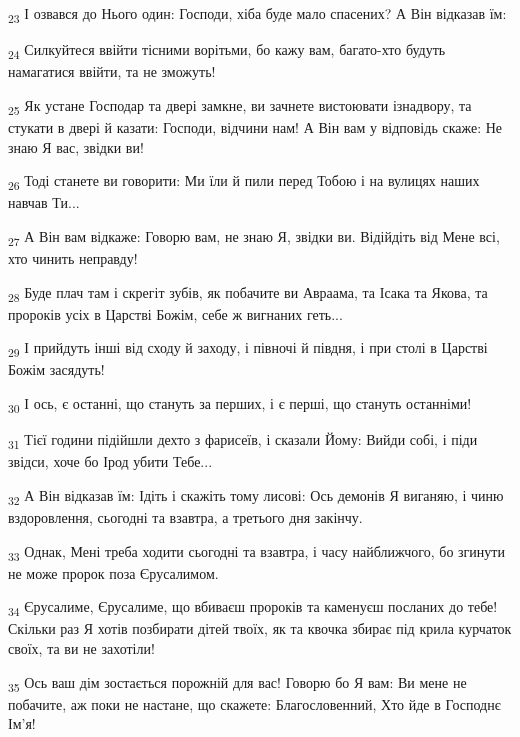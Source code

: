 \begin{tcolorbox}
\textsubscript{23} І озвався до Нього один: Господи, хіба буде мало спасених? А Він відказав їм:
\end{tcolorbox}
\begin{tcolorbox}
\textsubscript{24} Силкуйтеся ввійти тісними ворітьми, бо кажу вам, багато-хто будуть намагатися ввійти, та не зможуть!
\end{tcolorbox}
\begin{tcolorbox}
\textsubscript{25} Як устане Господар та двері замкне, ви зачнете вистоювати ізнадвору, та стукати в двері й казати: Господи, відчини нам! А Він вам у відповідь скаже: Не знаю Я вас, звідки ви!
\end{tcolorbox}
\begin{tcolorbox}
\textsubscript{26} Тоді станете ви говорити: Ми їли й пили перед Тобою і на вулицях наших навчав Ти...
\end{tcolorbox}
\begin{tcolorbox}
\textsubscript{27} А Він вам відкаже: Говорю вам, не знаю Я, звідки ви. Відійдіть від Мене всі, хто чинить неправду!
\end{tcolorbox}
\begin{tcolorbox}
\textsubscript{28} Буде плач там і скрегіт зубів, як побачите ви Авраама, та Ісака та Якова, та пророків усіх в Царстві Божім, себе ж вигнаних геть...
\end{tcolorbox}
\begin{tcolorbox}
\textsubscript{29} І прийдуть інші від сходу й заходу, і півночі й півдня, і при столі в Царстві Божім засядуть!
\end{tcolorbox}
\begin{tcolorbox}
\textsubscript{30} І ось, є останні, що стануть за перших, і є перші, що стануть останніми!
\end{tcolorbox}
\begin{tcolorbox}
\textsubscript{31} Тієї години підійшли дехто з фарисеїв, і сказали Йому: Вийди собі, і піди звідси, хоче бо Ірод убити Тебе...
\end{tcolorbox}
\begin{tcolorbox}
\textsubscript{32} А Він відказав їм: Ідіть і скажіть тому лисові: Ось демонів Я виганяю, і чиню вздоровлення, сьогодні та взавтра, а третього дня закінчу.
\end{tcolorbox}
\begin{tcolorbox}
\textsubscript{33} Однак, Мені треба ходити сьогодні та взавтра, і часу найближчого, бо згинути не може пророк поза Єрусалимом.
\end{tcolorbox}
\begin{tcolorbox}
\textsubscript{34} Єрусалиме, Єрусалиме, що вбиваєш пророків та каменуєш посланих до тебе! Скільки раз Я хотів позбирати дітей твоїх, як та квочка збирає під крила курчаток своїх, та ви не захотіли!
\end{tcolorbox}
\begin{tcolorbox}
\textsubscript{35} Ось ваш дім зостається порожній для вас! Говорю бо Я вам: Ви мене не побачите, аж поки не настане, що скажете: Благословенний, Хто йде в Господнє Ім'я!
\end{tcolorbox}
